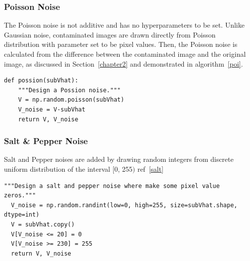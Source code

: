 \subsubsection{Poisson Noise}\label{sec:poi}
The Poisson noise is not additive and has no hyperparameters to be set. Unlike Gaussian noise, contaminated images are drawn directly from Poisson distribution with parameter set to be pixel values. Then, the Poisson noise is calculated from the difference between the contaminated image and the original image, as discussed in Section~\ref{chapter2} and demonstrated in algorithm~\ref{poi}.
\begin{lstlisting}[caption= Poisson Noise Design, label=poi]
def possion(subVhat):
    """Design a Possion noise."""
    V = np.random.poisson(subVhat)
    V_noise = V-subVhat
    return V, V_noise
\end{lstlisting}


\subsubsection{Salt \& Pepper Noise}\label{sec:sal}
Salt and Pepper noises are added by drawing random integers from discrete uniform distribution of the interval $[$0, 255$)$  ref~\ref{salt}
\begin{lstlisting}[caption= Salt and Pepper Noise Design, label=salt]
"""Design a salt and pepper noise where make some pixel value zeros."""
  V_noise = np.random.randint(low=0, high=255, size=subVhat.shape, dtype=int)
  V = subVhat.copy()
  V[V_noise <= 20] = 0
  V[V_noise >= 230] = 255
  return V, V_noise
\end{lstlisting}

